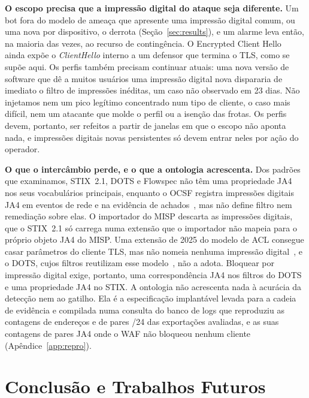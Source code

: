 \documentclass[conference,letterpaper,10pt]{IEEEtran}
\newcommand\1{\textit{(i)}}
\newcommand\2{\textit{(ii)}}
\newcommand\3{\textit{(iii)}}
\begin{document}
\textbf{O escopo precisa que a impressão digital do ataque seja diferente.} Um bot fora do modelo de ameaça que apresente uma impressão digital comum, ou uma nova por dispositivo, o derrota (Seção~\ref{sec:results}), e um alarme leva então, na maioria das vezes, ao recurso de contingência. O Encrypted Client Hello~\cite{ietf2026ech} ainda expõe o \textit{ClientHello} interno a um defensor que termina o TLS, como se supõe aqui. Os perfis também precisam continuar atuais: uma nova versão de software que dê a muitos usuários uma impressão digital nova dispararia de imediato o filtro de impressões inéditas, um caso não observado em 23 dias. Não injetamos nem um pico legítimo concentrado num tipo de cliente, o caso mais difícil, nem um atacante que molde o perfil ou a isenção das frotas. Os perfis devem, portanto, ser refeitos a partir de janelas em que o escopo não aponta nada, e impressões digitais novas persistentes só devem entrar neles por ação do operador.

\textbf{O que o intercâmbio perde, e o que a ontologia acrescenta.} Dos padrões que examinamos, STIX~2.1, DOTS e Flowspec não têm uma propriedade JA4 nos seus vocabulários principais, enquanto o OCSF registra impressões digitais JA4 em eventos de rede e na evidência de achados~\cite{ocsf2025schema}, mas não define filtro nem remediação sobre elas. O importador do MISP descarta as impressões digitais, que o STIX~2.1 só carrega numa extensão que o importador não mapeia para o próprio objeto JA4 do MISP. Uma extensão de 2025 do modelo de ACL consegue casar parâmetros do cliente TLS, mas não nomeia nenhuma impressão digital~\cite{ietf2025mudtls}, e o DOTS, cujos filtros reutilizam esse modelo~\cite{dots2020data}, não a adota. Bloquear por impressão digital exige, portanto, uma correspondência JA4 nos filtros do DOTS e uma propriedade JA4 no STIX. A ontologia não acrescenta nada à acurácia da detecção nem ao gatilho. Ela é a especificação implantável levada para a cadeia de evidência e compilada numa consulta do banco de logs que reproduziu as contagens de endereços e de pares /24 das exportações avaliadas, e as suas contagens de pares JA4 onde o WAF não bloqueou nenhum cliente (Apêndice~\ref{app:repro}).

\section{Conclusão e Trabalhos Futuros}
\label{sec:conclusion}
\end{document}
